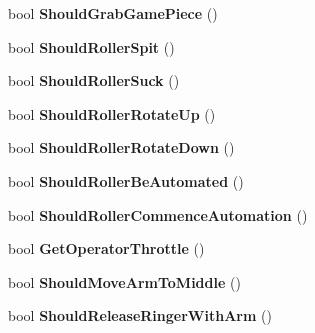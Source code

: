 \begin{DoxyCompactItemize}
\item 
\hypertarget{class_processed_inputs_ae444857a1945aa8062e4a20a8b38c4e4}{
bool {\bfseries \-Should\-Grab\-Game\-Piece} ()}
\label{class_processed_inputs_ae444857a1945aa8062e4a20a8b38c4e4}

\item 
\hypertarget{class_processed_inputs_a4dfc7b695ef616c4b5114fff6568338e}{
bool {\bfseries \-Should\-Roller\-Spit} ()}
\label{class_processed_inputs_a4dfc7b695ef616c4b5114fff6568338e}

\item 
\hypertarget{class_processed_inputs_abf8713cb78da57ed9368f9cdea8901d0}{
bool {\bfseries \-Should\-Roller\-Suck} ()}
\label{class_processed_inputs_abf8713cb78da57ed9368f9cdea8901d0}

\item 
\hypertarget{class_processed_inputs_a8267cc7fe7ddf3104a2b89966ba5bc3f}{
bool {\bfseries \-Should\-Roller\-Rotate\-Up} ()}
\label{class_processed_inputs_a8267cc7fe7ddf3104a2b89966ba5bc3f}

\item 
\hypertarget{class_processed_inputs_a03193fbd8fa1e18266aa19ed11d7b3bf}{
bool {\bfseries \-Should\-Roller\-Rotate\-Down} ()}
\label{class_processed_inputs_a03193fbd8fa1e18266aa19ed11d7b3bf}

\item 
\hypertarget{class_processed_inputs_a8eccd609c9c153ac8ca02a9913d967e6}{
bool {\bfseries \-Should\-Roller\-Be\-Automated} ()}
\label{class_processed_inputs_a8eccd609c9c153ac8ca02a9913d967e6}

\item 
\hypertarget{class_processed_inputs_a7193690108b6c582ae2a3bb1a0be0fbe}{
bool {\bfseries \-Should\-Roller\-Commence\-Automation} ()}
\label{class_processed_inputs_a7193690108b6c582ae2a3bb1a0be0fbe}

\item 
\hypertarget{class_processed_inputs_a988f17919ab291a5e4402b4815fc68f1}{
bool {\bfseries \-Get\-Operator\-Throttle} ()}
\label{class_processed_inputs_a988f17919ab291a5e4402b4815fc68f1}

\item 
\hypertarget{class_processed_inputs_ac5922323be2be1cd5d1c2fccc8eb531e}{
bool {\bfseries \-Should\-Move\-Arm\-To\-Middle} ()}
\label{class_processed_inputs_ac5922323be2be1cd5d1c2fccc8eb531e}

\item 
\hypertarget{class_processed_inputs_a0d07189624d584a1cdf9207b5efbe234}{
bool {\bfseries \-Should\-Release\-Ringer\-With\-Arm} ()}
\label{class_processed_inputs_a0d07189624d584a1cdf9207b5efbe234}


\end{DoxyCompactItemize}
